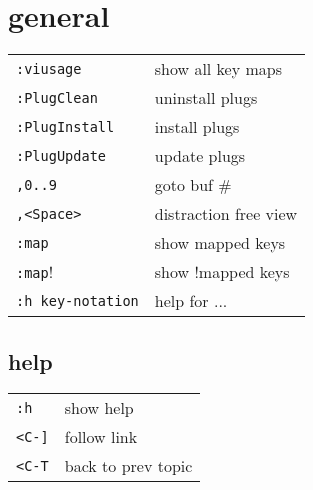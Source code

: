 \section{\hrulefill general\hrulefill}
\begin{tabular}{@{}ll@{}}
    \verb!:viusage!     & show all key maps \\
    \verb!:PlugClean!   & uninstall plugs \\
    \verb!:PlugInstall! & install plugs \\
    \verb!:PlugUpdate!  & update plugs \\
    \verb!,0..9!        & goto buf \# \\
    \verb!,<Space>!     & distraction free view \\
    \verb!:map!         & show mapped keys \\
    \verb!:map!!        & show !mapped keys \\
    \verb!:h key-notation! & help for ... \\
\end{tabular}

\subsection{help}
\begin{tabular}{@{}ll@{}}
    \verb!:h!           & show help \\
    \verb!<C-]!         & follow link \\
    \verb!<C-T!         & back to prev topic \\
\end{tabular}

